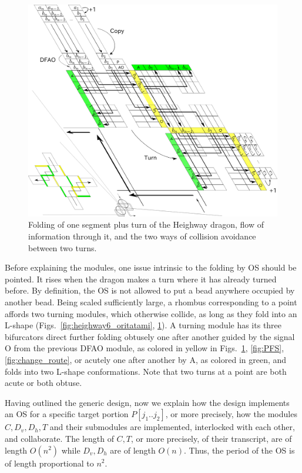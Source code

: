 \documentclass[runningheads]{llncs}
\begin{document}
\begin{figure}[tb]
\centering
\includegraphics[width=0.8\linewidth]{Figs/dragon_vol5.png}
\caption{
Folding of one segment plus turn of the Heighway dragon, flow of information through it, and the two ways of collision avoidance between two turns.
}
\label{fig:abst_dragon}
\end{figure}

Before explaining the modules, one issue intrinsic to the folding by OS should be pointed. 
It rises when the dragon makes a turn where it has already turned before. %
By definition, the OS is not allowed to put a bead anywhere occupied by another bead. 
Being scaled sufficiently large, a rhombus corresponding to a point affords two turning modules, which otherwise collide, as long as they fold into an L-shape (Figs.~\ref{fig:heighway6_oritatami}, \ref{fig:abst_dragon}). 
A turning module has its three bifurcators direct further folding obtusely one after another guided by the signal O from the previous DFAO module, as colored in yellow in Figs.~\ref{fig:abst_dragon}, \ref{fig:PFS}, \ref{fig:change_route}, or acutely one after another by A, as colored in green, and folds into two L-shape conformations. 
Note that two turns at a point are both acute or both obtuse. 

Having outlined the generic design, now we explain how the design implements an OS for a specific target portion $P[j_1 .. j_2]$, or more precisely, how the modules $C, D_v, D_h, T$ and their submodules are implemented, interlocked with each other, and collaborate. 
The length of $C, T$, or more precisely, of their transcript, are of length $O(n^2)$ while $D_v, D_h$ are of length $O(n)$. 
Thus, the period of the OS is of length proportional to $n^2$. 
\end{document}

